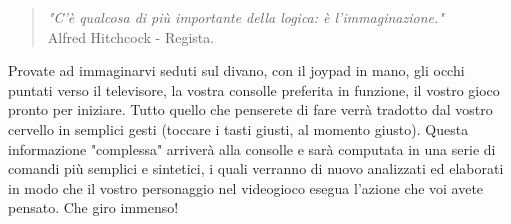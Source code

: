 \documentclass[11pt,fleqn,a5paper]{book} %
\begin{document}
    			\begin{quote}
    				\textit{"C'è qualcosa di più importante della logica: è l'immaginazione."}\\
    				Alfred Hitchcock - Regista.
    			\end{quote}
    		
    			Provate ad immaginarvi seduti sul divano, con il joypad in mano, gli occhi puntati verso il televisore, la vostra consolle preferita in funzione, il vostro gioco pronto per iniziare.
    			Tutto quello che penserete di fare verrà tradotto dal vostro cervello in semplici gesti (toccare i tasti giusti, al momento giusto). Questa informazione "complessa" arriverà alla consolle e sarà computata in una serie di comandi più semplici e sintetici, i quali verranno di nuovo analizzati ed elaborati in modo che il vostro personaggio nel videogioco esegua l'azione che voi avete pensato. Che giro immenso!
    			
\end{document}
